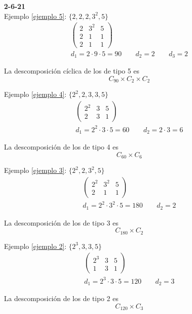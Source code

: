 \documentclass{article}
\begin{document}
\textbf{2-6-21} \\

Ejemplo \ref{ejemplo 5}: $\{2,2,2,3^2,5\}$
\begin{gather*}
\begin{pmatrix}
2&3^2&5\\
2&1&1\\
2&1&1
\end{pmatrix} \\
d_1=2\cdot 9\cdot 5=90\qquad d_2=2\qquad d_3=2
\end{gather*}

La descomposición cíclica de los de tipo 5 es
\begin{equation*}
C_{90}\times C_2\times C_2
\end{equation*}

Ejemplo \ref{ejemplo 4}: $\{2^2,2,3,3,5\}$
\begin{gather*}
\begin{pmatrix}
2^2&3&5\\
2&3&1
\end{pmatrix} \\
d_1=2^2\cdot 3\cdot 5=60 \qquad d_2=2\cdot 3=6
\end{gather*}

La descomposición de los de tipo 4 es
\begin{equation*}
C_{60}\times C_6
\end{equation*}

Ejemplo \ref{ejemplo 3}: $\{2^2,2,3^2,5\}$
\begin{gather*}
\begin{pmatrix}
2^2&3^2&5\\
2&1&1
\end{pmatrix}\\
d_1=2^2\cdot 3^2\cdot 5=180 \qquad d_2=2
\end{gather*}

La descomposición de los de tipo 3 es
\begin{equation*}
C_{180}\times C_2
\end{equation*}

Ejemplo \ref{ejemplo 2}: $\{2^3,3,3,5\}$
\begin{gather*}
\begin{pmatrix}
2^3&3&5\\
1&3&1
\end{pmatrix} \\
d_1=2^3\cdot 3\cdot 5=120\qquad d_2=3
\end{gather*}

La descomposición de los de tipo 2 es
\begin{equation*}
C_{120}\times C_3
\end{equation*}
\end{document}
